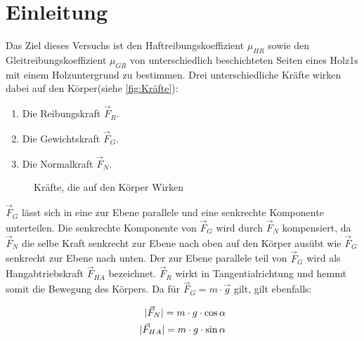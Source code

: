 \section{Einleitung}

Das Ziel dieses Versuchs ist den Haftreibungskoeffizient $\mu_{HR}$ sowie den Gleitreibungskoeffizient $\mu_{GR}$ von unterschiedlich beschichteten Seiten eines Holz1s mit einem Holzuntergrund zu bestimmen.
\newline
Drei unterschiedliche Kräfte wirken dabei auf den Körper(siehe \autoref{fig:Kräfte}):
\begin{enumerate}
    \item Die Reibungskraft $\vec{F}_R$.
    \item Die Gewichtskraft $\vec{F}_G$.
    \item Die Normalkraft $\vec{F}_N$.
\end{enumerate}


\usetikzlibrary{angles,quotes}
\begin{figure}
    \centering 
    
    \caption[Kräfte]{Kräfte, die auf den Körper Wirken}
    \label{fig:Kräfte}
\end{figure}

$\vec{F}_G$ lässt sich in eine zur Ebene parallele und eine senkrechte Komponente unterteilen. Die senkrechte Komponente von $\vec{F}_G$ wird durch $\vec{F}_N$ kompensiert, da $\vec{F}_N$ die selbe Kraft senkrecht zur Ebene nach oben auf den Körper ausübt wie $\vec{F}_G$ senkrecht zur Ebene nach unten. Der zur Ebene parallele teil von $\vec{F}_G$ wird als Hangabtriebskraft $\vec{F}_{HA}$ bezeichnet. $\vec{F}_R$ wirkt in Tangentialrichtung und hemmt somit die Bewegung des Körpers.\newline
Da für $\vec{F}_{G} = m \cdot \vec{g}$ gilt, gilt ebenfalls:

\begin{align}
    \lvert\vec{F}_{N}\rvert = m \cdot g \cdot \cos{\alpha} \label{eq:F_N} \\
    \lvert\vec{F}_{HA}\rvert = m \cdot g \cdot \sin{\alpha} \label{eq:F_HA}
\end{align}


